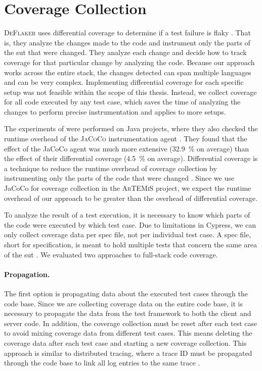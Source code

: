 \section{Coverage Collection}
\textsc{DeFlaker} uses differential coverage to determine if a test failure is flaky \autocite{bell_deflaker_2018}.
That is, they analyze the changes made to the code and instrument only the parts of the \ac{sut} that were changed.
They analyze each change and decide how to track coverage for that particular change by analyzing the code.
Because our approach works across the entire stack, the changes detected can span multiple languages and can be very complex.
Implementing differential coverage for each specific setup was not feasible within the scope of this thesis.
Instead, we collect coverage for all code executed by any test case, which saves the time of analyzing the changes to perform precise instrumentation and applies to more setups.

The experiments of \citeauthor*{bell_deflaker_2018} were performed on Java projects, where they also checked the runtime overhead of the \textsc{JaCoCo} instrumentation agent \autocite{bell_deflaker_2018}.
They found that the effect of the JaCoCo agent was much more extensive (\SI{32.9}{\percent} on average) than the effect of their differential coverage (\SI{4.5}{\percent} on average).
Differential coverage is a technique to reduce the runtime overhead of coverage collection by instrumenting only the parts of the code that were changed \autocite{bell_deflaker_2018}.
Since we use JaCoCo for coverage collection in the \textsc{ArTEMiS} project, we expect the runtime overhead of our approach to be greater than the overhead of differential coverage.

To analyze the result of a test execution, it is necessary to know which parts of the code were executed by which test case.
Due to limitations in Cypress, we can only collect coverage data per spec file, not per individual test case.
A spec file, short for specification, is meant to hold multiple tests that concern the same area of the \ac{sut} \autocite{noauthor_writing_nodate}.
We evaluated two approaches to full-stack code coverage.

\paragraph{Propagation.} The first option is propagating data about the executed test cases through the code base.
Since we are collecting coverage data on the entire code base, it is necessary to propagate the data from the test framework to both the client and server code.
In addition, the coverage collection must be reset after each test case to avoid mixing coverage data from different test cases.
This means deleting the coverage data after each test case and starting a new coverage collection.
This approach is similar to distributed tracing, where a trace ID must be propagated through the code base to link all log entries to the same trace \autocite{noauthor_distributed_nodate}.

